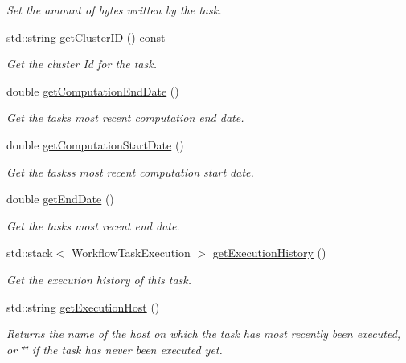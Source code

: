 \begin{DoxyCompactItemize}
\begin{DoxyCompactList}\small\item\em Set the amount of bytes written by the task. \end{DoxyCompactList}\item 
std\+::string \hyperlink{classwrench_1_1_workflow_task_a46ed2cbccf91f55c73fb99900a953d60}{get\+Cluster\+ID} () const
\begin{DoxyCompactList}\small\item\em Get the cluster Id for the task. \end{DoxyCompactList}\item 
double \hyperlink{classwrench_1_1_workflow_task_aa02796c5c85aa9fb9a1467eb06506a59}{get\+Computation\+End\+Date} ()
\begin{DoxyCompactList}\small\item\em Get the task\textquotesingle{}s most recent computation end date. \end{DoxyCompactList}\item 
double \hyperlink{classwrench_1_1_workflow_task_ab2caf3128cc4c396a1323ac74081fe0f}{get\+Computation\+Start\+Date} ()
\begin{DoxyCompactList}\small\item\em Get the tasks\textquotesingle{}s most recent computation start date. \end{DoxyCompactList}\item 
double \hyperlink{classwrench_1_1_workflow_task_a2c413ff97c665416c2c68898ef986df0}{get\+End\+Date} ()
\begin{DoxyCompactList}\small\item\em Get the task\textquotesingle{}s most recent end date. \end{DoxyCompactList}\item 
std\+::stack$<$ Workflow\+Task\+Execution $>$ \hyperlink{classwrench_1_1_workflow_task_a69dc57568ee24ef1d2824e9f6d919d48}{get\+Execution\+History} ()
\begin{DoxyCompactList}\small\item\em Get the execution history of this task. \end{DoxyCompactList}\item 
std\+::string \hyperlink{classwrench_1_1_workflow_task_af166a3b9b4b9d7a62711d3431961cd4f}{get\+Execution\+Host} ()
\begin{DoxyCompactList}\small\item\em Returns the name of the host on which the task has most recently been executed, or \char`\"{}\char`\"{} if the task has never been executed yet. \end{DoxyCompactList}\item 

\end{DoxyCompactItemize}
